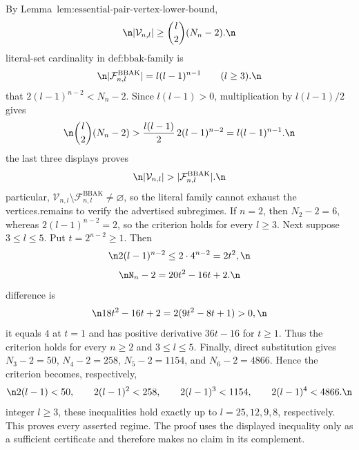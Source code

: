 By Lemma~\(\text{lem:essential-pair-vertex-lower-bound}\),\n\[\n|\mathcal V_{n,l}|\ge \binom{l}{2}(N_n-2).\n\]\nThe literal-set cardinality in \(\text{def:bbak-family}\) is\n\[\n|\mathcal F^{\mathrm{BBAK}}_{n,l}|=l(l-1)^{n-1}\qquad(l\ge3).\n\]\nSuppose that \(2(l-1)^{n-2}<N_n-2\). Since \(l(l-1)>0\), multiplication by \(l(l-1)/2\) gives\n\[\n\binom{l}{2}(N_n-2)>\frac{l(l-1)}{2}\,2(l-1)^{n-2}=l(l-1)^{n-1}.\n\]\nCombining the last three displays proves\n\[\n|\mathcal V_{n,l}|>|\mathcal F^{\mathrm{BBAK}}_{n,l}|.\n\]\nIn particular, \(\mathcal V_{n,l}\setminus\mathcal F^{\mathrm{BBAK}}_{n,l}\neq\varnothing\), so the literal family cannot exhaust the vertices.\n\nIt remains to verify the advertised subregimes. If \(n=2\), then \(N_2-2=6\), whereas \(2(l-1)^{n-2}=2\), so the criterion holds for every \(l\ge3\). Next suppose \(3\le l\le5\). Put \(t=2^{n-2}\ge1\). Then\n\[\n2(l-1)^{n-2}\le2\cdot4^{n-2}=2t^2,\n\]\nwhile\n\[\nN_n-2=20t^2-16t+2.\n\]\nTheir difference is\n\[\n18t^2-16t+2=2(9t^2-8t+1)>0,\n\]\nbecause it equals \(4\) at \(t=1\) and has positive derivative \(36t-16\) for \(t\ge1\). Thus the criterion holds for every \(n\ge2\) and \(3\le l\le5\). Finally, direct substitution gives \(N_3-2=50\), \(N_4-2=258\), \(N_5-2=1154\), and \(N_6-2=4866\). Hence the criterion becomes, respectively,\n\[\n2(l-1)<50,\qquad 2(l-1)^2<258,\qquad 2(l-1)^3<1154,\qquad 2(l-1)^4<4866.\n\]\nFor integer \(l\ge3\), these inequalities hold exactly up to \(l=25,12,9,8\), respectively. This proves every asserted regime. The proof uses the displayed inequality only as a sufficient certificate and therefore makes no claim in its complement.